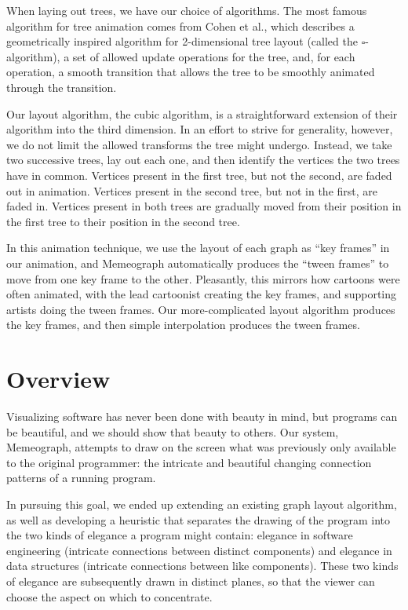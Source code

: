 \documentclass[11pt]{article}
\begin{document}
When laying out trees, we have our choice of algorithms.  The most famous algorithm for tree animation comes from Cohen et al.\cite{tamassia}, which describes a geometrically inspired algorithm for 2-dimensional tree layout (called the $\square$-algorithm), a set of allowed update operations for the tree, and, for each operation, a smooth transition that allows the tree to be smoothly animated through the transition.

Our layout algorithm, the cubic algorithm, is a straightforward extension of
their algorithm into the third dimension.  In an effort to strive for
generality, however, we do not limit the allowed transforms the tree might
undergo.  Instead, we take two successive trees, lay out each one, and then
identify the vertices the two trees have in common.  Vertices present in the
first tree, but not the second, are faded out in animation.  Vertices present
in the second tree, but not in the first, are faded in.  Vertices present in
both trees are gradually moved from their position in the first tree to their
position in the second tree.

In this animation technique, we use the layout of each graph as ``key frames''
in our animation, and Memeograph automatically produces the ``tween frames''
to move from one key frame to the other.  Pleasantly, this mirrors how cartoons
were often animated, with the lead cartoonist creating the key frames, and
supporting artists doing the tween frames.  Our more-complicated layout
algorithm produces the key frames, and then simple interpolation produces the
tween frames.

\section{Overview}

Visualizing software has never been done with beauty in mind, but programs can
be beautiful, and we should show that beauty to others.  Our system, Memeograph\nocite{memeograph}, attempts to draw on the screen what was previously only available to the original programmer: the intricate and beautiful changing connection patterns of a running program.

In pursuing this goal, we ended up extending an existing graph layout algorithm, as well as developing a heuristic that separates the drawing of the program into the two kinds of elegance a program might contain: elegance in software engineering (intricate connections between distinct components) and elegance in data structures (intricate connections between like components).  These two kinds of elegance are subsequently drawn in distinct planes, so that the viewer can choose the aspect on which to concentrate.

\setlength{\baselineskip}{13pt} 

\end{document}
